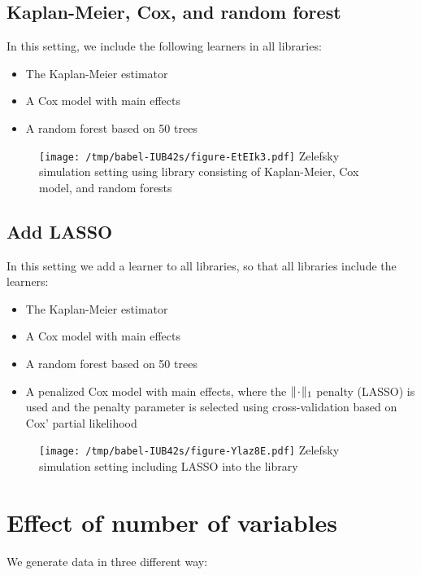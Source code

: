 \documentclass[a4paper,danish]{article}
\begin{document}
\clearpage

\subsection{Kaplan-Meier, Cox, and random forest}
\label{sec:orgdf8f8f8}
In this setting, we include the following learners in all libraries:

\begin{itemize}
\item The Kaplan-Meier estimator
\item A Cox model with main effects
\item A random forest based on 50 trees
\end{itemize}


\begin{figure}[htbp]
\centering
\texttt{[image: /tmp/babel-IUB42s/figure-EtEIk3.pdf]}
Zelefsky simulation setting using library consisting of Kaplan-Meier, Cox model, and random forests
\end{figure}

\clearpage

\subsection{Add LASSO}
\label{sec:org25907ea}
In this setting we add a learner to all libraries, so that all libraries include
the learners:

\begin{itemize}
\item The Kaplan-Meier estimator
\item A Cox model with main effects
\item A random forest based on 50 trees
\item A penalized Cox model with main effects, where the \(\|\blank\|_1\) penalty
(LASSO) is used and the penalty parameter is selected using cross-validation
based on Cox' partial likelihood
\end{itemize}

\begin{figure}[htbp]
\centering
\texttt{[image: /tmp/babel-IUB42s/figure-Ylaz8E.pdf]}
Zelefsky simulation setting including LASSO into the library
\end{figure}

\clearpage


\section{Effect of number of variables}
\label{sec:orged3af38}
We generate data in three different way:
\end{document}
